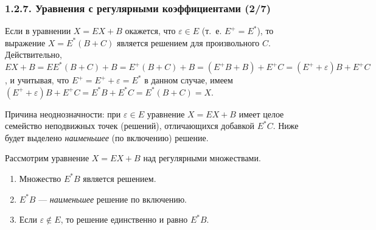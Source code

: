 \documentclass[mathserif,12pt,aspectratio=169]{beamer}
\begin{document}
\begin{frame}
\frametitle{1.2.7. Уравнения с регулярными коэффициентами (2/7)}
\begin{example}
Если в уравнении $X=EX+B$
окажется, что $\varepsilon\in E$
(т.~е. $E^+=E^*$), то
выражение $X=E^*(B+C)$ 
является решением для произвольного $C$.  
Действительно, $EX +B= EE^*(B+C) +B =
E^+(B+C) +B= (E^+B+B)+E^+C =
(E^++\varepsilon)B + E^+C$,
и учитывая, что $E^+=E^++\varepsilon=E^*$  в данном случае, имеем\\ 
$(E^++\varepsilon)B + E^+C = E^*B+E^*C=E^*(B+C)=X$.
\end{example}

\begin{remark}
Причина неоднозначности: при $\varepsilon\in E$ уравнение $X=EX+B$
имеет целое семейство неподвижных точек (решений), отличающихся добавкой $E^*C$.
Ниже будет выделено \emph{наименьшее} (по включению) решение.
\end{remark}

\begin{theorem}
Рассмотрим уравнение $X=EX+B$ над регулярными множествами.
\begin{enumerate}
\item Множество $E^*B$ является решением.
\item $E^*B$ --- \emph{наименьшее} решение по включению.
\item Если $\varepsilon\notin E$, то решение единственно и равно $E^*B$.
\end{enumerate}
\end{theorem}
\end{frame}
\end{document}
